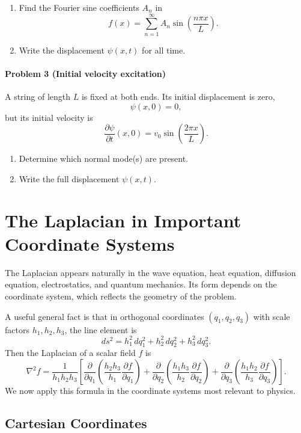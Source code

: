 \documentclass{report}
\numberwithin{equation}{section}
\begin{document}
\begin{enumerate}
    \item Find the Fourier sine coefficients $A_n$ in
    \[
    f(x)=\sum_{n=1}^{\infty} A_n \sin\left(\frac{n\pi x}{L}\right).
    \]
    \item Write the displacement $\psi(x,t)$ for all time.
\end{enumerate}
\paragraph{Problem 3 (Initial velocity excitation)} A string of length $L$ is fixed at both ends. Its initial displacement is zero,
\[
\psi(x,0)=0,
\]
but its initial velocity is
\[
\frac{\partial \psi}{\partial t}(x,0)=v_0\sin\left(\frac{2\pi x}{L}\right).
\]

\begin{enumerate}
    \item Determine which normal mode(s) are present.
    \item Write the full displacement $\psi(x,t)$.
\end{enumerate}

\section{The Laplacian in Important Coordinate Systems}

The Laplacian appears naturally in the wave equation, heat equation, diffusion equation, electrostatics, and quantum mechanics. Its form depends on the coordinate system, which reflects the geometry of the problem.

A useful general fact is that in orthogonal coordinates \( (q_1,q_2,q_3) \) with scale factors \(h_1,h_2,h_3\), the line element is
\[
ds^2 = h_1^2\,dq_1^2 + h_2^2\,dq_2^2 + h_3^2\,dq_3^2.
\]
Then the Laplacian of a scalar field \(f\) is
\[
\nabla^2 f
=
\frac{1}{h_1 h_2 h_3}
\left[
\frac{\partial}{\partial q_1}\!\left(\frac{h_2 h_3}{h_1}\frac{\partial f}{\partial q_1}\right)
+
\frac{\partial}{\partial q_2}\!\left(\frac{h_1 h_3}{h_2}\frac{\partial f}{\partial q_2}\right)
+
\frac{\partial}{\partial q_3}\!\left(\frac{h_1 h_2}{h_3}\frac{\partial f}{\partial q_3}\right)
\right].
\]
We now apply this formula in the coordinate systems most relevant to physics.

\subsection{Cartesian Coordinates}
\end{document}
